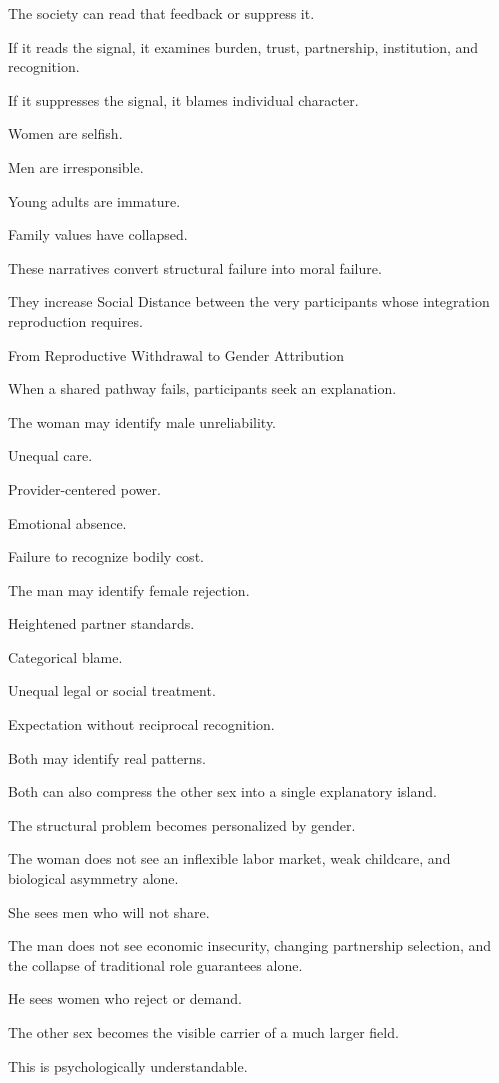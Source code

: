 The society can read that feedback or suppress it.

If it reads the signal, it examines burden, trust, partnership, institution, and recognition.

If it suppresses the signal, it blames individual character.

Women are selfish.

Men are irresponsible.

Young adults are immature.

Family values have collapsed.

These narratives convert structural failure into moral failure.

They increase Social Distance between the very participants whose integration reproduction requires.

From Reproductive Withdrawal to Gender Attribution

When a shared pathway fails, participants seek an explanation.

The woman may identify male unreliability.

Unequal care.

Provider-centered power.

Emotional absence.

Failure to recognize bodily cost.

The man may identify female rejection.

Heightened partner standards.

Categorical blame.

Unequal legal or social treatment.

Expectation without reciprocal recognition.

Both may identify real patterns.

Both can also compress the other sex into a single explanatory island.

The structural problem becomes personalized by gender.

The woman does not see an inflexible labor market, weak childcare, and biological asymmetry alone.

She sees men who will not share.

The man does not see economic insecurity, changing partnership selection, and the collapse of traditional role guarantees alone.

He sees women who reject or demand.

The other sex becomes the visible carrier of a much larger field.

This is psychologically understandable.

